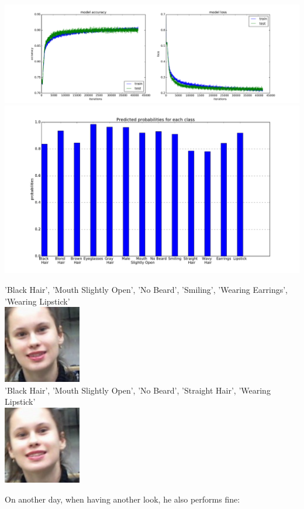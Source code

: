 \documentclass[12.5pt]{scrartcl}
\begin{document}
	\includegraphics[width=\linewidth]{images/lossGood}\\
	\includegraphics[width=0.8\linewidth]{images/accuracy_on_classes}
	
	'Black Hair', 'Mouth Slightly Open', 'No Beard', 'Smiling', 'Wearing Earrings', 'Wearing Lipstick' \\
	\includegraphics[height=0.1\textheight]{images/leti_normalised110} \\ 
	'Black Hair', 'Mouth Slightly Open', 'No Beard', 'Straight Hair', 'Wearing Lipstick' \\
	\includegraphics[height=0.1\textheight]{images/leti_normalised111} 
	
	On another day, when having another look, he also performs fine:
	
\end{document}
